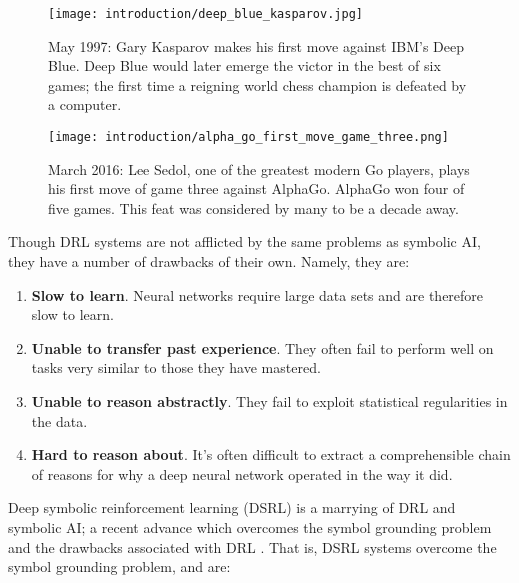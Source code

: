 \begin{figure}[h!]
\centering
\begin{minipage}{.45\textwidth}
  \centering
\texttt{[image: introduction/deep\_blue\_kasparov.jpg]}
  \caption{May 1997: Gary Kasparov makes his first move against IBM's Deep Blue. Deep Blue would later emerge the victor in the best of six games; the first time a reigning world chess champion is defeated by a computer. \cite{Rosen2012}}
  \label{fig:deep_blue_kasparov}
\end{minipage}%
  \hfill
\begin{minipage}{.45\textwidth}
  \centering
\texttt{[image: introduction/alpha\_go\_first\_move\_game\_three.png]}
  \caption{March 2016: Lee Sedol, one of the greatest modern Go players, plays his first move of game three against AlphaGo. AlphaGo won four of five games. This feat was considered by many to be a decade away. \cite{Ormerod2016}}
  \label{fig:alpha_go_first_move_game_three}
\end{minipage}
\end{figure}

Though DRL systems are not afflicted by the same problems as symbolic AI, they have a number of drawbacks of their own. Namely, they are: \cite{Garnelo2016}

\begin{enumerate}
\item \textbf{Slow to learn}. Neural networks require large data sets and are therefore
slow to learn.
\item \textbf{Unable to transfer past experience}. They often fail to perform well on tasks very
similar to those they have mastered.
\item \textbf{Unable to reason abstractly}. They fail to exploit statistical regularities in the data.
\item \textbf{Hard to reason about}. It's often difficult to extract a comprehensible chain of reasons for why a deep neural network operated in the way it did.
\end{enumerate}

Deep symbolic reinforcement learning (DSRL) is a marrying of DRL and symbolic AI; a recent advance which overcomes the symbol grounding problem and the drawbacks associated with DRL \cite{Garnelo2016}. That is, DSRL systems overcome the symbol grounding problem, and are:

